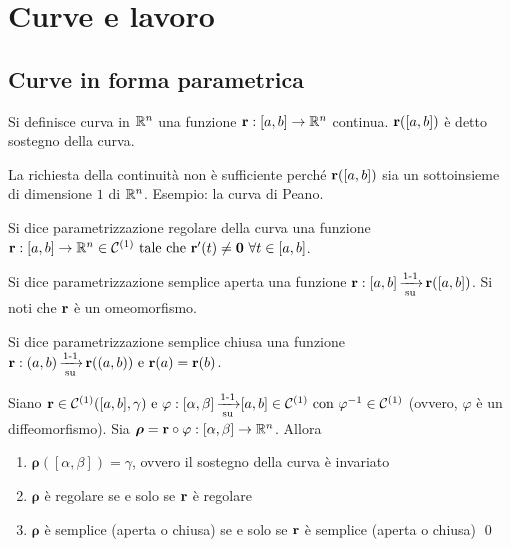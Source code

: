 \chapter{Curve e lavoro}\label{chap:curves}

\section{Curve in forma parametrica}

\begin{definition}
	[Curva]
	Si definisce curva in $\mathbb{R}^n$ una funzione $\vb{r}:[a,b]\to \mathbb{R}^n$ continua. $\vb{r}([a,b])$ è detto sostegno della curva.
\end{definition}

\begin{remark}
	La richiesta della continuità non è sufficiente perché $\vb{r}([a,b])$ sia un sottoinsieme di dimensione $1$ di $\mathbb{R}^n$. Esempio: la curva di Peano.
\end{remark}

\begin{definition}
	Si dice parametrizzazione regolare della curva una funzione $\vb{r}:[a,b]\to \mathbb{R}^n \in \mathcal{C}^{(1)} \text{ tale che } \vb{r}'(t)\neq\vb{0} \ \forall t \in [a,b]$.
\end{definition}

\begin{definition}
	Si dice parametrizzazione semplice aperta una funzione $\vb{r}: [a,b]\operatorname{\xrightarrow[\operatorname{su}]{\operatorname{1-1}}}\vb{r}([a,b])$. Si noti che $\vb{r}$ è un omeomorfismo.
\end{definition}

\begin{definition}
	Si dice parametrizzazione semplice chiusa una funzione $\vb{r}: (a,b)\operatorname{\xrightarrow[\operatorname{su}]{\operatorname{1-1}}} \vb{r}((a,b)) \text{ e } \vb{r}(a)=\vb{r}(b)$.
\end{definition}

\begin{theorem}
	Siano $\vb{r} \in \mathcal{C}^{(1)}([a,b],\gamma) \text{ e } \varphi:[\alpha,\beta]\operatorname{\xrightarrow[\operatorname{su}]{\operatorname{1-1}}}[a,b]\\\in \mathcal{C}^{(1)} \text{ con } \varphi^{-1} \in \mathcal{C}^{(1)}$ (ovvero, $\varphi$ è un diffeomorfismo). Sia $\bm\rho = \vb{r} \circ \varphi: [\alpha, \beta] \to \mathbb{R}^n$. Allora
	\begin{enumerate}
		\item $\bm\rho([\alpha,\beta])=\gamma$, ovvero il sostegno della curva è invariato
		\item $\bm\rho$ è regolare se e solo se $\vb{r}$ è regolare
		\item $\bm\rho$ è semplice (aperta o chiusa) se e solo se $\vb{r}$ è semplice (aperta o chiusa)
		\qed
	\end{enumerate}
\end{theorem}


